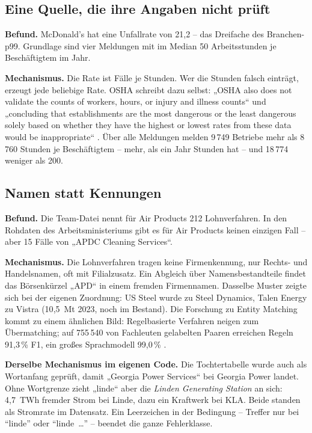 \documentclass[11pt,a4paper]{article}
\begin{document}
\subsection{Eine Quelle, die ihre Angaben nicht prüft}

\textbf{Befund.} McDonald's hat eine Unfallrate von 21{,}2 -- das Dreifache des Branchen-p99. Grundlage sind vier Meldungen mit im Median 50 Arbeitsstunden je Beschäftigtem im Jahr.

\textbf{Mechanismus.} Die Rate ist Fälle je Stunden. Wer die Stunden falsch einträgt, erzeugt jede beliebige Rate. OSHA schreibt dazu selbst: „OSHA also does not validate the counts of workers, hours, or injury and illness counts“ und „concluding that establishments are the most dangerous or the least dangerous solely based on whether they have the highest or lowest rates from these data would be inappropriate“ \cite{ositaguide}. Über alle Meldungen melden 9\,749 Betriebe mehr als 8\,760 Stunden je Beschäftigtem -- mehr, als ein Jahr Stunden hat -- und 18\,774 weniger als 200.

\subsection{Namen statt Kennungen}

\textbf{Befund.} Die Team-Datei nennt für Air Products 212 Lohnverfahren. In den Rohdaten des Arbeitsministeriums gibt es für Air Products keinen einzigen Fall -- aber 15 Fälle von „APDC Cleaning Services“.

\textbf{Mechanismus.} Die Lohnverfahren tragen keine Firmenkennung, nur Rechts- und Handelsnamen, oft mit Filialzusatz. Ein Abgleich über Namensbestandteile findet das Börsenkürzel „APD“ in einem fremden Firmennamen. Dasselbe Muster zeigte sich bei der eigenen Zuordnung: US Steel wurde zu Steel Dynamics, Talen Energy zu Vistra (10{,}5~Mt 2023, noch im Bestand). Die Forschung zu Entity Matching kommt zu einem ähnlichen Bild: Regelbasierte Verfahren neigen zum Übermatching; auf 755\,540 von Fachleuten gelabelten Paaren erreichen Regeln 91{,}3\,\% F1, ein großes Sprachmodell 99{,}0\,\% \cite{opensanctions}.

\textbf{Derselbe Mechanismus im eigenen Code.} Die Tochtertabelle wurde auch als Wortanfang geprüft, damit „Georgia Power Services“ bei Georgia Power landet. Ohne Wortgrenze zieht „linde“ aber die \emph{Linden Generating Station} an sich: 4,7~TWh fremder Strom bei Linde, dazu ein Kraftwerk bei KLA. Beide standen als Stromrate im Datensatz. Ein Leerzeichen in der Bedingung -- Treffer nur bei ``linde'' oder ``linde~\ldots'' -- beendet die ganze Fehlerklasse.
\end{document}
